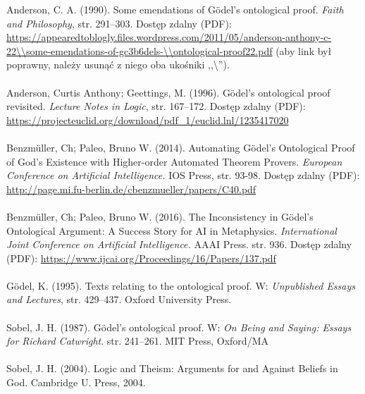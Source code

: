 \documentclass[12pt]{article}
\begin{document}
\begin{multicols}{2}
\noindent [Anderson, 1990] Anderson, C. A. (1990). Some emendations of G\"odel’s ontological proof. \textit{Faith and Philosophy}, str. 291–303. Dostęp zdalny (PDF): \url{https://appearedtoblogly.files.wordpress.com/2011/05/anderson-anthony-c-22\\some-emendations-of-gc3b6dels-\\ontological-proof22.pdf} (aby link był poprawny, należy usunąć z niego oba ukośniki ,,\textbackslash''). 
\\ \\
\noindent [Anderson, 1996] Anderson, Curtis Anthony; Geettings, M. (1996). G\"odel’s ontological proof revisited. \textit{Lecture Notes in Logic}, str. 167–172. Dostęp zdalny (PDF): \url{https://projecteuclid.org/download/pdf_1/euclid.lnl/1235417020}
\\ \\
 Benzm\"uller, Ch; Paleo, Bruno W. (2014). Automating G\"odel’s Ontological Proof of God’s Existence with Higher-order Automated Theorem Provers. \textit{European Conference on Artificial Intelligence.} IOS Press, str. 93-98. Dostęp zdalny (PDF): \url{http://page.mi.fu-berlin.de/cbenzmueller/papers/C40.pdf}
\\ \\
 Benzm\"uller, Ch; Paleo, Bruno W. (2016). The Inconsistency in G\"odel's Ontological Argument: A Success Story for AI in Metaphysics. \textit{International Joint Conference on Artificial Intelligence.} AAAI Press. str. 936. Dostęp zdalny (PDF): \url{https://www.ijcai.org/Proceedings/16/Papers/137.pdf}
\\ \\ 
\noindent [G\"odel, 1995] G\"odel, K. (1995). Texts relating to the ontological proof. W: \textit{Unpublished Essays and Lectures}, str. 429–437. Oxford University Press. 
\\ \\ 
\noindent [Sobel, 1987] Sobel, J. H. (1987). G\"odel’s ontological proof. W: \textit{On Being and Saying: Essays for Richard Catwright}. str. 241–261. MIT Press, Oxford/MA
\\ \\ 
\noindent [Sobel, 2004] Sobel, J. H. (2004). Logic and Theism: Arguments for and Against Beliefs in God. Cambridge U. Press, 2004.

\end{multicols}
\end{document}
